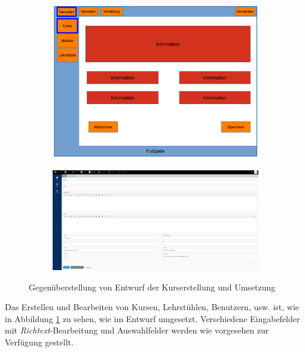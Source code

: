         \begin{figure}[p]
            \centering
            \begin{subfigure}{\textwidth}
                \includegraphics[width=1.0\textwidth]{./implementation/images/MockUpsBackend/backendEdit.png}
            \end{subfigure}
            \begin{subfigure}{\textwidth}
                \includegraphics[width=1.0\textwidth]{./implementation/images/edit.png}
            \end{subfigure}
            \caption{Gegenüberstellung von Entwurf der Kurserstellung und Umsetzung}
            \label{fig:comparisonEdit}
        \end{figure}
    
        Das Erstellen und Bearbeiten von Kursen, Lehrstühlen, Benutzern, usw. ist, wie in Abbildung \ref{fig:comparisonEdit} zu sehen, wie im Entwurf umgesetzt.
        Verschiedene Eingabefelder mit \textit{Richtext}-Bearbeitung und Auswahlfelder werden wie vorgesehen zur Verfügung gestellt.
    
